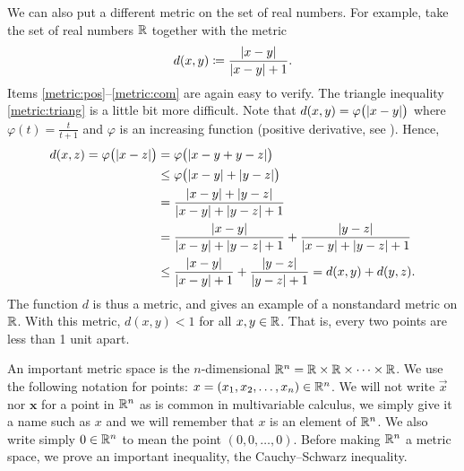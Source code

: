 \begin{example}
We can also put a different metric on the set of real numbers.
For example, take the set of real numbers ${\mathbb{R}}$ together with the metric
\begin{equation*}
d(x,y) \coloneqq
\frac{\lvert {x-y} \rvert}{\lvert {x-y} \rvert+1} .
\end{equation*}
Items \ref{metric:pos}--\ref{metric:com} are again easy to verify.  The
triangle inequality \ref{metric:triang} is a little bit more difficult.
Note that $d(x,y) = \varphi\bigl(\lvert {x-y} \rvert\bigr)$ where $\varphi(t) =
\frac{t}{t+1}$ and $\varphi$ is an increasing function
(positive derivative, see ).
Hence,
\begin{equation*}
\begin{split}
d(x,z) = \varphi\bigl(\lvert {x-z} \rvert\bigr)
& = 
\varphi\bigl(\lvert {x-y+y-z} \rvert\bigr) \\
& \leq
\varphi\bigl(\lvert {x-y} \rvert+\lvert {y-z} \rvert\bigr)
\\
& =
\frac{\lvert {x-y} \rvert+\lvert {y-z} \rvert}{\lvert {x-y} \rvert+\lvert {y-z} \rvert+1} \\
& =
\frac{\lvert {x-y} \rvert}{\lvert {x-y} \rvert+\lvert {y-z} \rvert+1} +
\frac{\lvert {y-z} \rvert}{\lvert {x-y} \rvert+\lvert {y-z} \rvert+1}
\\
& \leq
\frac{\lvert {x-y} \rvert}{\lvert {x-y} \rvert+1} +
\frac{\lvert {y-z} \rvert}{\lvert {y-z} \rvert+1} =
d(x,y)+ d(y,z) .
\end{split}
\end{equation*}
The function $d$ is thus a metric, and gives
an example of a nonstandard metric on ${\mathbb{R}}$.  With this metric,
$d(x,y) < 1$ for all $x,y \in {\mathbb{R}}$.  That is,
every two points are less than 1 unit apart.
\begin{myfigureht}
\caption{Graph of $\frac{t}{t+1}$ for positive $t$ with an asymptote at 1.\label{fig:tovertp1}}
\end{myfigureht}
\end{example}

An important metric space is the
$n$-dimensional \emph{}
${\mathbb{R}}^n = {\mathbb{R}} \times {\mathbb{R}} \times \cdots \times {\mathbb{R}}$.   We use the following
notation for points: $x =(x_1,x_2,\ldots,x_n) \in {\mathbb{R}}^n$.  We will not write
$\vec{x}$ nor $\mathbf{x}$ for a point in ${\mathbb{R}}^n$ as is common in
multivariable calculus,
we simply give it a name such as $x$ and we will remember that $x$
is an element of ${\mathbb{R}}^n$.
We also
write simply $0 \in {\mathbb{R}}^n$ to mean the point $(0,0,\ldots,0)$.  Before
making ${\mathbb{R}}^n$ a metric space, we prove an important inequality, the
Cauchy--Schwarz inequality.

